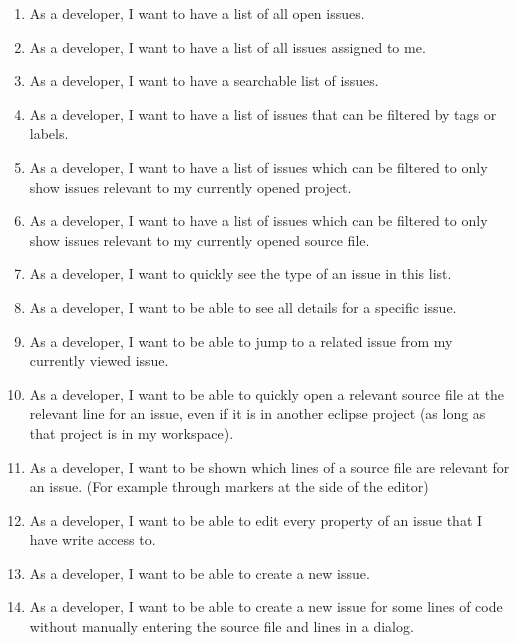 \begin{enumerate}
	\item As a developer, I want to have a list of all open issues. \label{itm:ch3:req:filter_open}
	\item As a developer, I want to have a list of all issues assigned to me. \label{itm:ch3:req:filter_me}
	\item As a developer, I want to have a searchable list of issues. \label{itm:ch3:req:filter_search}
	\item As a developer, I want to have a list of issues that can be filtered by tags or labels. \label{itm:ch3:req:filter_labels}
	\item As a developer, I want to have a list of issues which can be filtered to only show issues relevant to my currently opened project. \label{itm:ch3:req:filter_open project}
	\item As a developer, I want to have a list of issues which can be filtered to only show issues relevant to my currently opened source file. \label{itm:ch3:req:filter_open_file}
	\item As a developer, I want to quickly see the type of an issue in this list. \label{itm:ch3:req:list_issue_type}
	\item As a developer, I want to be able to see all details for a specific issue.
	\item As a developer, I want to be able to jump to a related issue from my currently viewed issue.
	\item As a developer, I want to be able to quickly open a relevant source file at the relevant line for an issue, even if it is in another eclipse project (as long as that project is in my workspace).
	\item As a developer, I want to be shown which lines of a source file are relevant for an issue. (For example through markers at the side of the editor) \label{itm:ch3:req:source_file_marker}
	\item As a developer, I want to be able to edit every property of an issue that I have write access to.
	\item As a developer, I want to be able to create a new issue.
	\item As a developer, I want to be able to create a new issue for some lines of code without manually entering the source file and lines in a dialog.
	\setcounter{enumarteCounter}{\value{enumi}} %
\end{enumerate}

